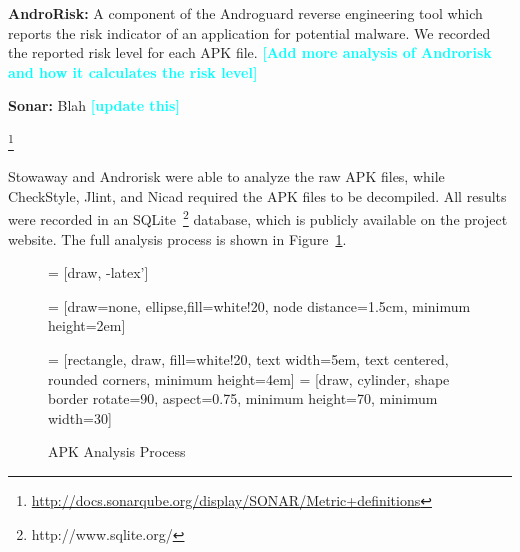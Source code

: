 \documentclass[conference]{IEEEtran}
\newcommand{\todo}[1]{\textcolor{cyan}{\textbf{[#1]}}}
\begin{document}
 \textbf{AndroRisk\cite{androguard_url}:} A component of the Androguard reverse engineering tool which reports the risk indicator of an application for potential malware. We recorded the reported risk level for each APK file. \todo{Add more analysis of Androrisk and how it calculates the risk level}

 \textbf{Sonar:} Blah \todo{update this}

\footnote{\url{http://docs.sonarqube.org/display/SONAR/Metric+definitions}}

Stowaway and Androrisk were able to analyze the raw APK files, while CheckStyle, Jlint, and Nicad required the APK files to be decompiled. All results were recorded in an SQLite~\footnote{http://www.sqlite.org/} database, which is publicly available on the project website. The full analysis process is shown in Figure~\ref{fig:analysisprocess}.

\begin{figure}[h]
\begin{center}
\label{fig:analysisprocess}
 = [draw, -latex']

 = [draw=none, ellipse,fill=white!20, node distance=1.5cm, minimum height=2em]

 = [rectangle, draw, fill=white!20, text width=5em, text centered, rounded corners, minimum height=4em]
 = [draw, cylinder, shape border rotate=90, aspect=0.75, minimum height=70, minimum width=30]

\caption{APK Analysis Process}
\end{center}
\end{figure}
\end{document}
